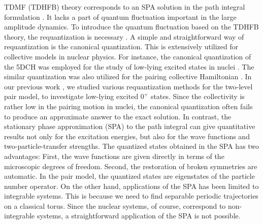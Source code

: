 \documentclass[%
superscriptaddress,
showpacs,
nofootinbib,
amsmath,amssymb,
aps,
prc,
twocolumn,
floatfix ]%
{revtex4-1}
\begin{document}
TDMF (TDHFB) theory corresponds to an SPA solution in the path integral
formulation \cite{Neg82}.
It lacks a part of quantum fluctuation
important in the large amplitude dynamics.
To introduce the quantum fluctuation based on the TDHFB theory,
the requantization is necessary \cite{Neg82,L80,LNP80,Rei80,KS80,K81}.
A simple and straightforward way of requantization is
the canonical quantization.
This is extensively utilized for collective models in nuclear physics.
For instance,
the canonical quantization of the 5DCH was employed for the study of low-lying
excited states in nuclei \cite{PR09,HSNMM10,NMMY16}.
The similar quantization was also utilized for the pairing collective
Hamiltonian \cite{BBPK70, GPBW85, ZPPRS99, P07}.
In our previous work \cite{NN18},
we studied various requantization methods for the two-level pair model,
to investigate low-lying excited $0^+$ states.
Since the collectivity is rather low in the pairing motion in nuclei,
the canonical quantization often fails to produce an approximate answer
to the exact solution.
In contrast,
the stationary phase approximation (SPA) to the path integral \cite{SM88} 
can give quantitative results not only for the excitation energies, 
but also for the wave functions and two-particle-transfer strengths.
The quantized states obtained in the SPA has two advantages:
First, the wave functions are given directly in terms of
the microscopic degrees of freedom.
Second, the restoration of broken symmetries are automatic.
In the pair model, the quantized states are eigenstates of the particle number
operator.
On the other hand, applications of the SPA has been limited to
integrable systems.
This is because we need to find separable periodic trajectories on a classical
torus.
Since the nuclear systems, of course, correspond to non-integrable systems,
a straightforward application of the SPA is not possible.
\end{document}
